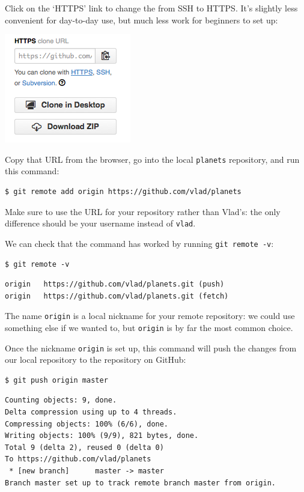 \documentclass{book}
\begin{document}
Click on the `HTTPS' link to change the 
from SSH to HTTPS. It's slightly less convenient for day-to-day use, but
much less work for beginners to set up:

\includegraphics{novice/git/img/github-change-repo-string.png}

Copy that URL from the browser, go into the local \texttt{planets}
repository, and run this command:

\begin{verbatim}
$ git remote add origin https://github.com/vlad/planets
\end{verbatim}

Make sure to use the URL for your repository rather than Vlad's: the
only difference should be your username instead of \texttt{vlad}.

We can check that the command has worked by running
\texttt{git remote -v}:

\begin{verbatim}
$ git remote -v
\end{verbatim}

\begin{verbatim}
origin   https://github.com/vlad/planets.git (push)
origin   https://github.com/vlad/planets.git (fetch)
\end{verbatim}

The name \texttt{origin} is a local nickname for your remote repository:
we could use something else if we wanted to, but \texttt{origin} is by
far the most common choice.

Once the nickname \texttt{origin} is set up, this command will push the
changes from our local repository to the repository on GitHub:

\begin{verbatim}
$ git push origin master
\end{verbatim}

\begin{verbatim}
Counting objects: 9, done.
Delta compression using up to 4 threads.
Compressing objects: 100% (6/6), done.
Writing objects: 100% (9/9), 821 bytes, done.
Total 9 (delta 2), reused 0 (delta 0)
To https://github.com/vlad/planets
 * [new branch]      master -> master
Branch master set up to track remote branch master from origin.
\end{verbatim}
\end{document}
